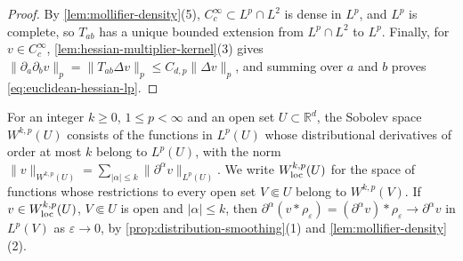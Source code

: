 \begin{proof}
By \cref{lem:mollifier-density}(5), $C_c^\infty\subset L^p\cap L^2$ is dense in $L^p$, and $L^p$ is complete, so $T_{ab}$ has a unique bounded extension from $L^p\cap L^2$ to $L^p$. Finally, for $v\in C_c^\infty$, \cref{lem:hessian-multiplier-kernel}(3) gives $\|\partial_a\partial_bv\|_p=\|T_{ab}\Delta v\|_p\leq C_{d,p}\|\Delta v\|_p$, and summing over $a$ and $b$ proves \eqref{eq:euclidean-hessian-lp}.
\end{proof}

For an integer $k\geq0$, $1\leq p<\infty$ and an open set $U\subset\mathbb R^d$, the Sobolev space $W^{k,p}(U)$ consists of the functions in $L^p(U)$ whose distributional derivatives of order at most $k$ belong to $L^p(U)$, with the norm $\|v\|_{W^{k,p}(U)}=\sum_{|\alpha|\leq k}\|\partial^\alpha v\|_{L^p(U)}$. We write $W^{k,p}_{\mathrm{loc}}(U)$ for the space of functions whose restrictions to every open set $V\Subset U$ belong to $W^{k,p}(V)$. If $v\in W^{k,p}_{\mathrm{loc}}(U)$, $V\Subset U$ is open and $|\alpha|\leq k$, then $\partial^\alpha(v*\rho_\varepsilon)=(\partial^\alpha v)*\rho_\varepsilon\to\partial^\alpha v$ in $L^p(V)$ as $\varepsilon\to0$, by \cref{prop:distribution-smoothing}(1) and \cref{lem:mollifier-density}(2).

